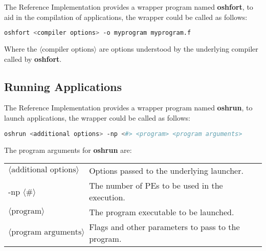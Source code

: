 The  \openshmem{} Reference Implementation provides a wrapper program named \textbf{oshfort}, to aid in the compilation of \Fortran{} applications,
the wrapper could be called as follows:

\begin{lstlisting}[language=bash]
oshfort <compiler options> -o myprogram myprogram.f
\end{lstlisting}
Where the $\langle\mbox{compiler options}\rangle$ are options understood by the underlying \Fortran{} compiler called by \textbf{oshfort}.

\subsection{Running Applications}

The  \openshmem{} Reference Implementation provides a wrapper program named \textbf{oshrun}, to launch \openshmem applications, the wrapper could
be called as follows:

\begin{lstlisting}[language=bash]
oshrun <additional options> -np <#> <program> <program arguments>
\end{lstlisting}
The program arguments for \textbf{oshrun} are:

\begin{tabular}{p{}p{}}
$\langle\mbox{additional options}\rangle$ & {Options passed to the underlying launcher.}\tabularnewline
-np $\langle\mbox{\#}\rangle$ & {The number of \ac{PE}s to be used in the execution.}\tabularnewline
$\langle\mbox{program}\rangle$ & {The program executable to be launched.}\tabularnewline
$\langle\mbox{program arguments}\rangle$ & {Flags and other parameters to pass to the program.}\tabularnewline
\end{tabular}


